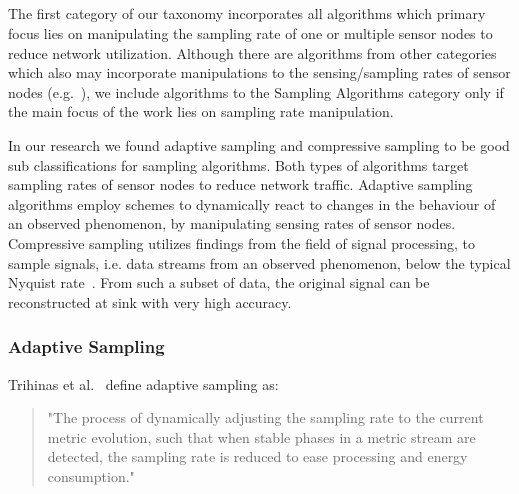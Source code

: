 \FloatBarrier


\subsection{\catI} %
\label{sec:catI}

The first category of our taxonomy incorporates all algorithms which primary
focus lies on manipulating the sampling rate of one or multiple sensor nodes to
reduce network utilization. Although there are algorithms from other categories
which also may incorporate manipulations to the sensing/sampling rates of
sensor nodes (e.g.~\cite{trihinas2015adam, chatterjea2008adaptive}), we include
algorithms to the Sampling Algorithms category only if the main focus of the
work lies on sampling rate manipulation. 

In our research we found adaptive sampling and compressive sampling to be good
sub classifications for sampling algorithms. Both types of algorithms target
sampling rates of sensor nodes to reduce network traffic. Adaptive sampling
algorithms employ schemes to dynamically react to changes in the behaviour of
an observed phenomenon, by manipulating sensing rates of sensor nodes.
Compressive sampling utilizes findings from the field of signal processing, to
sample signals, i.e. data streams from an observed phenomenon, below the
typical Nyquist rate~\cite{candes2008introduction}. From such a subset of data,
the original signal can be reconstructed at sink with very high accuracy.

\subsubsection{Adaptive Sampling}
\label{sec:Adaptive Sampling}

Trihinas et al.~\cite{trihinas2015adam} define adaptive sampling as:

\begin{quote}
    "The process of dynamically adjusting the sampling rate to the current
    metric evolution, such that when stable phases in a metric stream are
    detected, the sampling rate is reduced to ease processing and energy
    consumption."
\end{quote}

